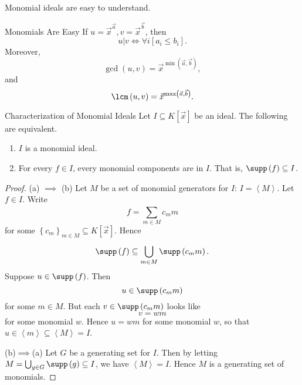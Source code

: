 \documentclass[co439]{subfiles}
\begin{document}
    \np Monomial ideals are easy to understand.

    \begin{example}{Monomials Are Easy}
        If $u=\vec{x}^{\vec{a}}, v=\vec{x}^{\vec{b}}$, then
        \begin{equation*}
            u | v \iff \forall i\left[ a_i\leq b_i \right].
        \end{equation*}
        Moreover,
        \begin{equation*}
            \gcd\left( u,v \right) = \vec{x}^{\min\left( \vec{a},\vec{b} \right)},
        \end{equation*}
        and
        \begin{equation*}
            \lcm\left( u,v \right) = \vec{x}^{\max\left( \vec{a},\vec{b} \right)}.
        \end{equation*}
    \end{example}

    \rruleline
    
    \begin{prop}{Characterization of Monomial Ideals}
        Let $I\subseteq K\left[ \vec{x} \right]$ be an ideal. The following are equivalent.
        \begin{enumerate}
            \item $I$ is a monomial ideal.
            \item For every $f\in I$, every monomial components are in $I$. That is, $\supp\left( f \right)\subseteq I$.
        \end{enumerate}
    \end{prop}
    
    \begin{proof}
        (a) $\implies$ (b) Let $M$ be a set of monomial generators for $I$: $I=\left< M \right>$. Let $f\in I$. Write
        \begin{equation*}
            f = \sum^{}_{m\in M} c_mm
        \end{equation*}
        for some $\left\lbrace c_m \right\rbrace^{}_{m\in M}\subseteq K\left[ \vec{x} \right]$. Hence
        \begin{equation*}
            \supp\left( f \right) \subseteq \bigcup^{}_{m\in M} \supp\left( c_mm \right).
        \end{equation*}
        Suppose $u\in\supp\left( f \right)$. Then
        \begin{equation*}
            u \in \supp\left( c_mm \right)
        \end{equation*}
        for some $m\in M$. But each $v\in\supp\left( c_mm \right)$ looks like
        \begin{equation*}
            v = wm
        \end{equation*}
        for some monomial $w$. Hence $u=wm$ for some monomial $w$, so that $u\in\left< m \right> \subseteq \left< M \right> = I$.  

        (b)$\implies$(a) Let $G$ be a generating set for $I$. Then by letting $M = \bigcup^{}_{g\in G}\supp\left( g \right)\subseteq I$, we have $\left< M \right> = I$. Hence $M$ is a generating set of monomials. 
    \end{proof}
\end{document}
